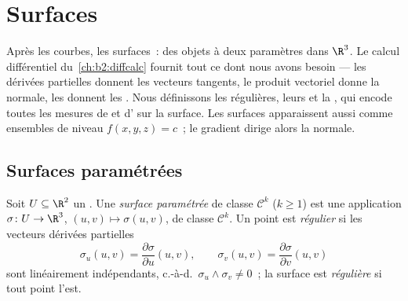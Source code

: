 \chapter{Surfaces}\label{ch:b2:surfaces}

Après les courbes, les surfaces~: des objets à deux paramètres
dans $\R^3$. Le calcul différentiel du~\cref{ch:b2:diffcalc}
fournit tout ce dont nous avons besoin --- les dérivées
partielles donnent les vecteurs tangents, le produit vectoriel
donne la normale, les  donnent les . Nous
définissons les  régulières, leurs  et la \emph{}, qui encode
toutes les mesures de  et d' sur la surface. Les
surfaces apparaissent aussi comme ensembles de niveau
$f(x, y, z) = c$~; le gradient dirige alors la normale.

\section{Surfaces paramétrées}

\begin{definition}\label{def:b2:surfaces:param}
Soit $U \subseteq \R^2$ un . Une \emph{surface
paramétrée} de
classe $\mathcal{C}^k$ ($k \geq 1$) est une application $\sigma \colon U \to
\R^3$, $(u, v) \mapsto \sigma(u, v)$, de classe $\mathcal{C}^k$. Un
point est \emph{régulier} si les vecteurs dérivées partielles
\[
\sigma_u(u, v) = \frac{\partial\sigma}{\partial u}(u,v),
\qquad
\sigma_v(u, v) = \frac{\partial\sigma}{\partial v}(u,v)
\]
sont linéairement indépendants, c.-à-d.\ $\sigma_u \wedge \sigma_v \neq 0$~;
la surface est \emph{régulière} si tout point l'est.
\end{definition}

